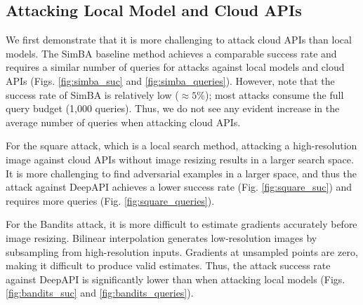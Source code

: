 \subsection{Attacking Local Model and Cloud APIs}

We first demonstrate that it is more challenging to attack cloud APIs than local models. The SimBA baseline method achieves a comparable success rate and requires a similar number of queries for attacks against local models and cloud APIs (Figs. \ref{fig:simba_suc} and \ref{fig:simba_queries}). However, note that the success rate of SimBA is relatively low ($\approx 5\%$); most attacks consume the full query budget (1,000 queries). Thus, we do not see any evident increase in the average number of queries when attacking cloud APIs.

For the square attack, which is a local search method, attacking a high-resolution image against cloud APIs without image resizing results in a larger search space. It is more challenging to find adversarial examples in a larger space, and thus the attack against DeepAPI achieves a lower success rate (Fig. \ref{fig:square_suc}) and requires more queries (Fig. \ref{fig:square_queries}). 

For the Bandits attack, it is more difficult to estimate gradients accurately before image resizing. Bilinear interpolation generates low-resolution images by subsampling from high-resolution inputs. Gradients at unsampled points are zero, making it difficult to produce valid estimates. Thus, the attack success rate against DeepAPI is significantly lower than when attacking local models (Figs. \ref{fig:bandits_suc} and \ref{fig:bandits_queries}). 


